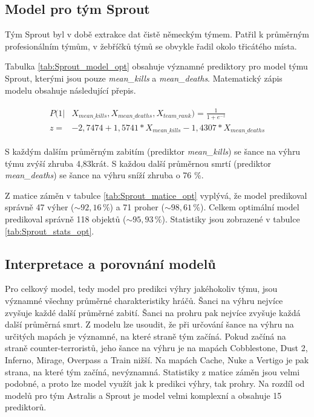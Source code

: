 \subsection{Model pro tým Sprout}
Tým Sprout byl v době extrakce dat čistě německým týmem. Patřil k průměrným profesionálním týmům, v žebříčků týmů se obvykle řadil okolo třicátého místa.



Tabulka \ref{tab:Sprout_model_opt} obsahuje významné prediktory pro model týmu Sprout, kterými jsou pouze \textit{mean\_kills} a \textit{mean\_deaths}.
Matematický zápis modelu obsahuje následující přepis.

\begin{align}
    \begin{split}
        P(1 | &X_{mean\_kills}, X_{mean\_deaths}, X_{team\_rank}) = \frac{1}{1 + e^{-z}} \\
        z =   &-2,7474 + 1,5741*X_{mean\_kills} - 1,4307*X_{mean\_deaths}
    \end{split}
\end{align}

S každým dalším průměrným zabitím (prediktor \textit{mean\_kills}) se šance na výhru týmu zvýší zhruba 4,83krát. S každou další průměrnou smrtí (prediktor \textit{mean\_deaths})
se šance na výhru sníží zhruba o 76 \%.





Z matice záměn v tabulce \ref{tab:Sprout_matice_opt} vyplývá, že model predikoval správně 47 výher ($\sim 92,16 \,\%$) a 71 proher ($\sim 98,61 \,\%$).
Celkem optimální model predikoval správně 118 objektů ($\sim 95,93 \,\%$). Statistiky jsou zobrazené v tabulce \ref{tab:Sprout_stats_opt}.

\subsection{Interpretace a porovnání modelů}
Pro celkový model, tedy model pro predikci výhry jakéhokoliv týmu, jsou významné všechny průměrné charakteristiky hráčů. Šanci na výhru nejvíce zvyšuje každé
další průměrné zabití. Šanci na prohru pak nejvíce zvyšuje každá další průměrná smrt. Z modelu lze usoudit, že při určování šance na výhru na určitých mapách je významné, na které 
straně tým začíná. Pokud začíná na straně counter-terroristů, jeho šance na výhru je na mapách Cobblestone, Dust 2,
Inferno, Mirage, Overpass a Train nižší. Na mapách Cache, Nuke a Vertigo je pak strana, na které tým začíná, nevýznamná. Statistiky z matice záměn jsou velmi podobné, a proto
lze model využít jak k predikci výhry, tak prohry. Na rozdíl od modelů pro tým Astralis a Sprout je model velmi komplexní a obsahuje 15 prediktorů.

